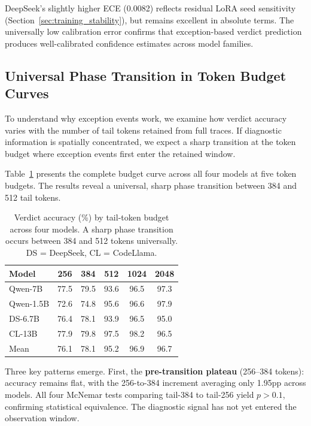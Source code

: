 \documentclass[11pt,a4paper]{article}
\begin{document}
DeepSeek's slightly higher ECE (0.0082) reflects residual LoRA seed sensitivity (Section~\ref{sec:training_stability}), but remains excellent in absolute terms. The universally low calibration error confirms that exception-based verdict prediction produces well-calibrated confidence estimates across model families.

\subsection{Universal Phase Transition in Token Budget Curves}
\label{sec:phase_transition}

To understand why exception events work, we examine how verdict accuracy varies with the number of tail tokens retained from full traces. If diagnostic information is spatially concentrated, we expect a sharp transition at the token budget where exception events first enter the retained window.

Table~\ref{tab:budget} presents the complete budget curve across all four models at five token budgets. The results reveal a universal, sharp phase transition between 384 and 512 tail tokens.

\begin{table}[t]
\centering
\small
\begin{tabular}{lccccc}
\toprule
\textbf{Model} & \textbf{256} & \textbf{384} & \textbf{512} & \textbf{1024} & \textbf{2048} \\
\midrule
Qwen-7B & 77.5 & 79.5 & 93.6 & 96.5 & 97.3 \\
Qwen-1.5B & 72.6 & 74.8 & 95.6 & 96.6 & 97.9 \\
DS-6.7B & 76.4 & 78.1 & 93.9 & 96.5 & 95.0 \\
CL-13B & 77.9 & 79.8 & 97.5 & 98.2 & 96.5 \\
\midrule
Mean & 76.1 & 78.1 & 95.2 & 96.9 & 96.7 \\
\bottomrule
\end{tabular}
\caption{Verdict accuracy (\%) by tail-token budget across four models. A sharp phase transition occurs between 384 and 512 tokens universally. DS = DeepSeek, CL = CodeLlama.}
\label{tab:budget}
\end{table}

Three key patterns emerge. First, the \textbf{pre-transition plateau} (256--384 tokens): accuracy remains flat, with the 256-to-384 increment averaging only 1.95pp across models. All four McNemar tests comparing tail-384 to tail-256 yield $p > 0.1$, confirming statistical equivalence. The diagnostic signal has not yet entered the observation window.
\end{document}
